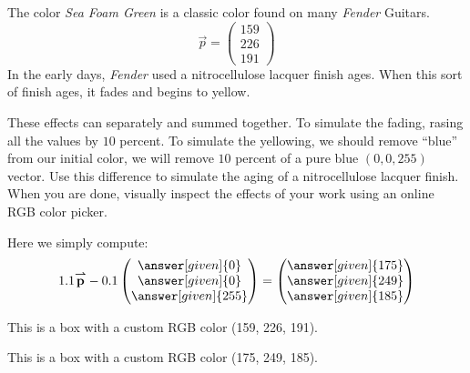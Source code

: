 \documentclass{ximera}
\begin{document}
\begin{example}
  The color \textit{Sea Foam Green} is a classic color found on many \textit{Fender} Guitars.
  \[
  \vec{p} =
  \begin{pmatrix}
    159 \\ 226 \\ 191
  \end{pmatrix}
  \]
  In the early days, \textit{Fender} used a nitrocellulose lacquer
  finish ages. When this sort of finish ages, it fades and begins to
  yellow.

  These effects can separately and summed together. To simulate the
  fading, rasing all the values by $10$ percent. To simulate the
  yellowing, we should remove ``blue'' from our initial color, we will
  remove $10$ percent of a pure blue $(0,0,255)$ vector. Use this
  difference to simulate the aging of a nitrocellulose lacquer
  finish. When you are done, visually inspect the effects of your work
  using an online RGB color picker.
  \begin{explanation}
    Here we simply compute:
    \[
    1.1 \vec{p} - 0.1  \begin{pmatrix} \answer[given]{0} \\  \answer[given]{0} \\  \answer[given]{255} \end{pmatrix}
    = \begin{pmatrix} \answer[given]{175} \\  \answer[given]{249} \\  \answer[given]{185} \end{pmatrix}
    \]
    \colorbox[rgb]{0.624, 0.886, 0.749}{%
  \parbox{\dimexpr\linewidth-2\fboxsep\relax}{%
    This is a box with a custom RGB color (159, 226, 191).
    }}

    \colorbox[rgb]{0.686, 0.976, 0.725}{%
  \parbox{\dimexpr\linewidth-2\fboxsep\relax}{%
    This is a box with a custom RGB color (175, 249, 185).
    }}
  \end{explanation}
\end{example}
\end{document}
